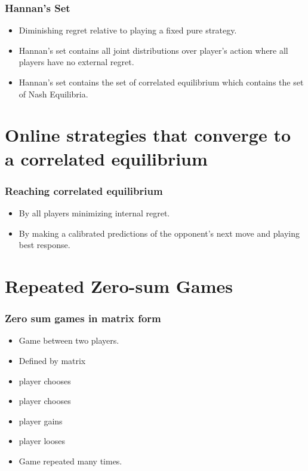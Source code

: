 \documentclass{beamer}
\begin{document}
\begin{frame}
\frametitle{Hannan's Set}
\begin{itemize}
\item Diminishing regret relative to playing a fixed pure strategy.
\item Hannan's set contains all joint distributions over player's
  action where all players have no external regret.
\item Hannan's set contains the set of correlated equilibrium which
  contains the set of Nash Equilibria.
\end{itemize}
\end{frame}


\section{Online strategies that converge to a correlated equilibrium}
\begin{frame}
\frametitle{Reaching correlated equilibrium}
\begin{itemize}
\item By all players minimizing internal regret.
\item By making a calibrated predictions of the opponent's next move
  and playing best response.
\end{itemize}
\end{frame}

\section{Repeated Zero-sum Games}

\begin{frame}
\frametitle{Zero sum games in matrix form}
\begin{itemize}
\item Game between two players.
\item Defined by  matrix \R{$\M$}
\item {} player chooses 
\item {} player chooses 
\item {} player gains 
\item {} player looses 
\item Game repeated many times.
\end{itemize}
\end{frame}
\end{document}
